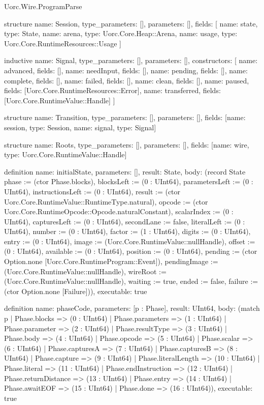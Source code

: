 \begin{lexlean}{Uorc.Wire.ProgramParse}
\begin{semanticmodule}
structure{
  name: Session,
  type_parameters: [],
  parameters: [],
  fields: [
    {name: state, type: State},
    {name: arena, type: Uorc.Core.Heap::Arena},
    {name: usage, type: Uorc.Core.RuntimeResources::Usage}
  ]
}

inductive{
  name: Signal,
  type_parameters: [],
  parameters: [],
  constructors: [
    {name: advanced, fields: []},
    {name: needInput, fields: []},
    {name: pending, fields: []},
    {name: complete, fields: []},
    {name: failed, fields: []},
    {name: clean, fields: []},
    {name: paused, fields: [Uorc.Core.RuntimeResources::Error]},
    {name: transferred, fields: [Uorc.Core.RuntimeValue::Handle]}
  ]
}

structure{
  name: Transition,
  type_parameters: [],
  parameters: [],
  fields: [{name: session, type: Session}, {name: signal, type: Signal}]
}

structure{
  name: Roots,
  type_parameters: [],
  parameters: [],
  fields: [{name: wire, type: Uorc.Core.RuntimeValue::Handle}]
}

definition{
  name: initialState,
  parameters: [],
  result: State,
  body: (record State {phase := (ctor Phase.blocks), blocksLeft := (0 : UInt64), parametersLeft := (0 : UInt64), instructionsLeft := (0 : UInt64), result := (ctor Uorc.Core.RuntimeValue::RuntimeType.natural), opcode := (ctor Uorc.Core.RuntimeOpcode::Opcode.naturalConstant), scalarIndex := (0 : UInt64), capturesLeft := (0 : UInt64), secondLane := false, literalLeft := (0 : UInt64), number := (0 : UInt64), factor := (1 : UInt64), digits := (0 : UInt64), entry := (0 : UInt64), image := (Uorc.Core.RuntimeValue::nullHandle), offset := (0 : UInt64), available := (0 : UInt64), position := (0 : UInt64), pending := (ctor Option.none [Uorc.Core.RuntimeProgram::Event]), pendingImage := (Uorc.Core.RuntimeValue::nullHandle), wireRoot := (Uorc.Core.RuntimeValue::nullHandle), waiting := true, ended := false, failure := (ctor Option.none [Failure])}),
  executable: true
}

definition{
  name: phaseCode,
  parameters: [p : Phase],
  result: UInt64,
  body: (match p
    | Phase.blocks => (0 : UInt64)
    | Phase.parameters => (1 : UInt64)
    | Phase.parameter => (2 : UInt64)
    | Phase.resultType => (3 : UInt64)
    | Phase.body => (4 : UInt64)
    | Phase.opcode => (5 : UInt64)
    | Phase.scalar => (6 : UInt64)
    | Phase.capturesA => (7 : UInt64)
    | Phase.capturesB => (8 : UInt64)
    | Phase.capture => (9 : UInt64)
    | Phase.literalLength => (10 : UInt64)
    | Phase.literal => (11 : UInt64)
    | Phase.endInstruction => (12 : UInt64)
    | Phase.returnDistance => (13 : UInt64)
    | Phase.entry => (14 : UInt64)
    | Phase.awaitEOF => (15 : UInt64)
    | Phase.done => (16 : UInt64)),
  executable: true
}


\end{semanticmodule}
\end{lexlean}
